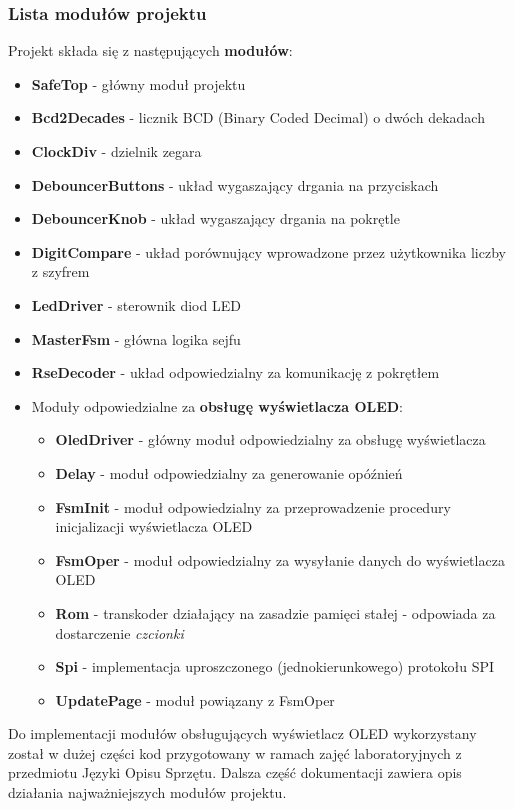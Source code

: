 \documentclass[12pt] {article}
\begin{document}
\subsubsection{Lista modułów projektu}
Projekt składa się z następujących \textbf{modułów}:
\begin{itemize}
\item \textbf{SafeTop} - główny moduł projektu
\item \textbf{Bcd2Decades} - licznik BCD (Binary Coded Decimal) o dwóch dekadach
\item \textbf{ClockDiv} - dzielnik zegara
\item \textbf{DebouncerButtons} - układ wygaszający drgania na przyciskach
\item \textbf{DebouncerKnob} - układ wygaszający drgania na pokrętle
\item \textbf{DigitCompare} - układ porównujący wprowadzone przez użytkownika liczby z szyfrem 
\item \textbf{LedDriver} - sterownik diod LED
\item \textbf{MasterFsm} - główna logika sejfu
\item \textbf{RseDecoder} - układ odpowiedzialny za komunikację z pokrętłem
\item Moduły odpowiedzialne za \textbf{obsługę wyświetlacza OLED}: 
\begin{itemize}
\item \textbf{OledDriver} - główny moduł odpowiedzialny za obsługę wyświetlacza
\item \textbf{Delay} - moduł odpowiedzialny za generowanie opóźnień
\item \textbf{FsmInit} - moduł odpowiedzialny za przeprowadzenie procedury inicjalizacji wyświetlacza OLED
\item \textbf{FsmOper} - moduł odpowiedzialny za wysyłanie danych do wyświetlacza OLED
\item \textbf{Rom} - transkoder działający na zasadzie pamięci stałej - odpowiada za dostarczenie \textit{czcionki}
\item \textbf{Spi} - implementacja uproszczonego (jednokierunkowego) protokołu SPI
\item \textbf{UpdatePage} - moduł powiązany z FsmOper
\end{itemize}
\end{itemize}
Do implementacji modułów obsługujących wyświetlacz OLED wykorzystany został w dużej części kod przygotowany w ramach zajęć laboratoryjnych z przedmiotu Języki Opisu Sprzętu. Dalsza część dokumentacji zawiera opis działania najważniejszych modułów projektu.
\end{document}
